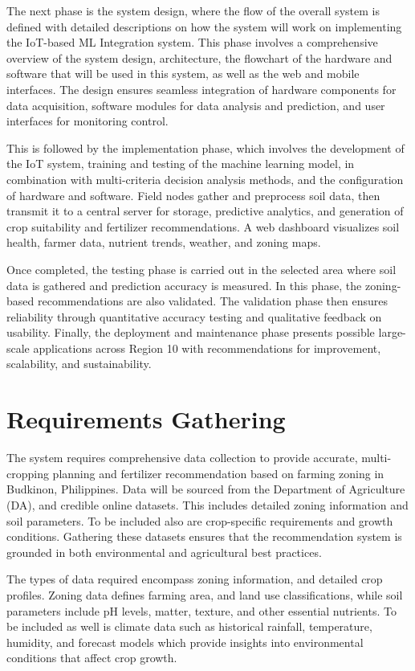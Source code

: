 {	The next phase is the system design, where the flow of the overall system is defined with detailed descriptions on how the system will work on implementing the IoT-based ML Integration system.  This phase involves a comprehensive overview of the system design, architecture, the flowchart of the hardware and software that will be used in this system, as well as the web and mobile interfaces. The design ensures seamless integration of hardware components for data acquisition, software modules for data analysis and prediction, and user interfaces for monitoring control.
	
	This is followed by the implementation phase, which involves the development of the IoT system, training and testing of the machine learning model, in combination with multi-criteria decision analysis methods, and the configuration of hardware and software. Field nodes gather and preprocess soil data, then transmit it to a central server for storage, predictive analytics, and generation of crop suitability and fertilizer recommendations. A web dashboard visualizes soil health, farmer data, nutrient trends, weather, and zoning maps.
	
	Once completed, the testing phase is carried out in the selected area where soil data is gathered and prediction accuracy is measured. In this phase, the zoning-based recommendations are also validated. The validation phase then ensures reliability through quantitative accuracy testing and qualitative feedback on usability.  Finally, the deployment and maintenance phase presents possible large-scale applications across Region 10 with recommendations for improvement, scalability, and sustainability.

	\section{Requirements Gathering}
	The system requires comprehensive data collection to provide accurate, multi-cropping planning and fertilizer recommendation based on farming zoning in Budkinon, Philippines. Data will be sourced from the Department of Agriculture (DA), and credible online datasets. This includes detailed zoning information and soil parameters. To be included also are crop-specific requirements and growth conditions. Gathering these datasets ensures that the recommendation system is grounded in both environmental and agricultural best practices.
	 
	The types of data required encompass zoning information, and detailed crop profiles. Zoning data defines farming area, and land use classifications, while soil parameters include pH levels, matter, texture, and other essential nutrients. To be included as well is climate data such as historical rainfall, temperature, humidity, and forecast models which provide insights into environmental conditions that affect crop growth.
	
}
